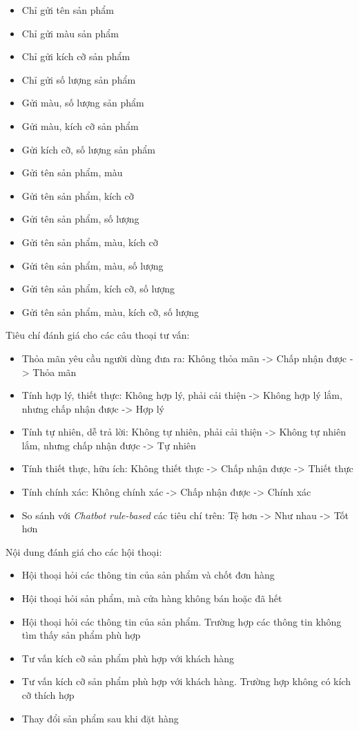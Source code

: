 \begin{itemize}
\begin{itemize}
        \item Chỉ gửi tên sản phẩm
        \item Chỉ gửi màu sản phẩm
        \item Chỉ gửi kích cỡ sản phẩm
        \item Chỉ gửi số lượng sản phẩm
        \item Gửi màu, số lượng sản phẩm
        \item Gửi màu, kích cỡ sản phẩm
        \item Gửi kích cỡ, số lượng sản phẩm
        \item Gửi tên sản phẩm, màu
        \item Gửi tên sản phẩm, kích cỡ
        \item Gửi tên sản phẩm, số lượng
        \item Gửi tên sản phẩm, màu, kích cỡ
        \item Gửi tên sản phẩm, màu, số lượng
        \item Gửi tên sản phẩm, kích cỡ, số lượng
        \item Gửi tên sản phẩm, màu, kích cỡ, số lượng
    \end{itemize}
\end{itemize}

Tiêu chí đánh giá cho các câu thoại tư vấn:

\begin{itemize}
    \item Thỏa mãn yêu cầu người dùng đưa ra: Không thỏa mãn -> Chấp nhận được -> Thỏa mãn
    \item Tính hợp lý, thiết thực: Không hợp lý, phải cải thiện -> Không hợp lý lắm, nhưng chấp nhận được -> Hợp lý
    \item Tính tự nhiên, dễ trả lời: Không tự nhiên, phải cải thiện -> Không tự nhiên lắm, nhưng chấp nhận được -> Tự nhiên
    \item Tính thiết thực, hữu ích: Không thiết thực -> Chấp nhận được -> Thiết thực
    \item Tính chính xác: Không chính xác -> Chấp nhận được -> Chính xác
    \item So sánh với \textit{Chatbot rule-based} các tiêu chí trên: Tệ hơn -> Như nhau -> Tốt hơn
\end{itemize}

Nội dung đánh giá cho các hội thoại:

\begin{itemize}
    \item Hội thoại hỏi các thông tin của sản phẩm và chốt đơn hàng
    \item Hội thoại hỏi sản phẩm, mà cửa hàng không bán hoặc đã hết
    \item Hội thoại hỏi các thông tin của sản phẩm. Trường hợp các thông tin không tìm thấy sản phẩm phù hợp
    \item Tư vấn kích cỡ sản phẩm phù hợp với khách hàng
    \item Tư vấn kích cỡ sản phẩm phù hợp với khách hàng. Trường hợp không có kích cỡ thích hợp
    \item Thay đổi sản phẩm sau khi đặt hàng
\end{itemize}

